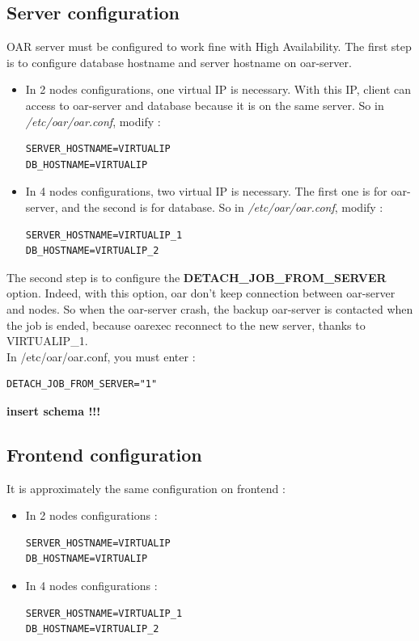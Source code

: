 \documentclass[a4paper,10pt]{report}
\begin{document}
\subsection{Server configuration}
OAR server must be configured to work fine with High Availability. The first step is to configure database hostname and server hostname on oar-server.
\begin{itemize}
 \item In 2 nodes configurations, one virtual IP is necessary. With this IP, client can access to oar-server and database because it is on the same server.
So in \textit{/etc/oar/oar.conf}, modify :
\begin{lstlisting}
SERVER_HOSTNAME=VIRTUALIP
DB_HOSTNAME=VIRTUALIP
\end{lstlisting}
\item In 4 nodes configurations, two virtual IP is necessary. The first one is for oar-server, and the second is for database.
So in \textit{/etc/oar/oar.conf}, modify :
\begin{lstlisting}
SERVER_HOSTNAME=VIRTUALIP_1
DB_HOSTNAME=VIRTUALIP_2
\end{lstlisting}

\end{itemize}


The second step is to configure the \textbf{DETACH\_JOB\_FROM\_SERVER} option. Indeed, with this option, oar don't keep connection between oar-server and nodes.
So when the oar-server crash, the backup oar-server is contacted when the job is ended, because oarexec reconnect to the new server, thanks to VIRTUALIP\_1.\\
In /etc/oar/oar.conf, you must enter :
\begin{lstlisting}
DETACH_JOB_FROM_SERVER="1"
\end{lstlisting}

\textbf{insert schema !!!}

\subsection{Frontend configuration}
It is approximately the same configuration on frontend :\\
\begin{itemize}
 \item In 2 nodes configurations :
\begin{lstlisting}
SERVER_HOSTNAME=VIRTUALIP
DB_HOSTNAME=VIRTUALIP
\end{lstlisting}
\item In 4 nodes configurations :
\begin{lstlisting}
SERVER_HOSTNAME=VIRTUALIP_1
DB_HOSTNAME=VIRTUALIP_2
\end{lstlisting}
\end{itemize}
\end{document}
